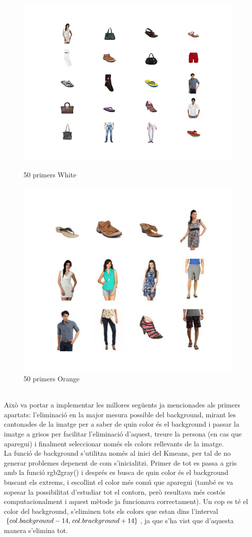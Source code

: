\documentclass[a4paper, 11pt]{article}
\begin{document}
\begin{figure}[h!]
\centering
\begin{minipage}{.5\textwidth}
  \centering
  \includegraphics[width=.6\linewidth]{blancosmalos.png}
  \caption*{50 primers White}
\end{minipage}%
\begin{minipage}{.5\textwidth}
  \centering
  \includegraphics[width=.5\linewidth]{naranjito_malo.png}
  \caption*{50 primers Orange}
\end{minipage}
\end{figure}
\label{millores_filtratge_colors}\\Això va portar a implementar les millores següents ja mencionades als primers apartats: l'eliminació en la major mesura possible del background, mirant les cantonades de la imatge per a saber de quin color és el background i passar la imatge a grisos per facilitar l'eliminació d'aquest, treure la persona (en cas que aparegui) i finalment seleccionar només els colors rellevants de la imatge.\\
La funció de background s'utilitza només al inici del Kmeans, per tal de no generar problemes depenent de com s'inicialitzi. Primer de tot es passa a gris amb la funció \textcolor{funcblue}{rgb2gray()} i després es busca de quin color és el background buscant els extrems, i escollint el color més comú que  aparegui (també es va sopesar la possibilitat d'estudiar tot el contorn, però resultava més costós computacionalment i aquest mètode ja funcionava correctament). Un cop es té el color del background, s'eliminen tots els colors que estan dins l'interval $\{col. background -14, \hspace{0.1em}col. brackground + 14\}$, ja que s'ha vist que d'aquesta manera s'elimina tot.\\
\end{document}
